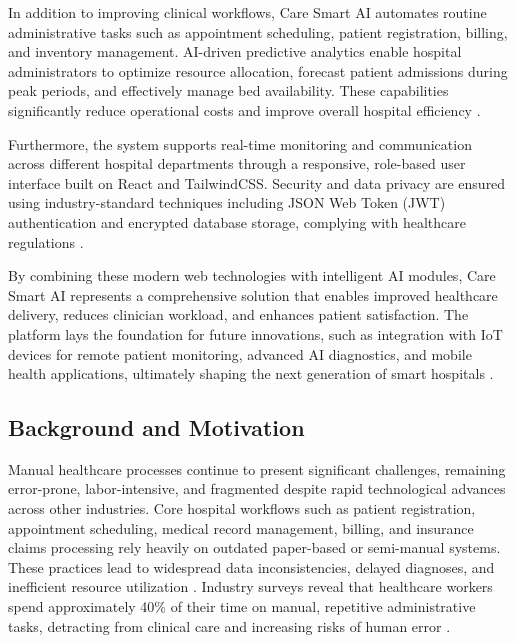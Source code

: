 \documentclass[conference]{IEEEtran}
\begin{document}
In addition to improving clinical workflows, Care Smart AI automates routine administrative tasks such as appointment scheduling, patient registration, billing, and inventory management. AI-driven predictive analytics enable hospital administrators to optimize resource allocation, forecast patient admissions during peak periods, and effectively manage bed availability. These capabilities significantly reduce operational costs and improve overall hospital efficiency \cite{web:13,web:16}.

Furthermore, the system supports real-time monitoring and communication across different hospital departments through a responsive, role-based user interface built on React and TailwindCSS. Security and data privacy are ensured using industry-standard techniques including JSON Web Token (JWT) authentication and encrypted database storage, complying with healthcare regulations \cite{web:17,web:18}.

By combining these modern web technologies with intelligent AI modules, Care Smart AI represents a comprehensive solution that enables improved healthcare delivery, reduces clinician workload, and enhances patient satisfaction. The platform lays the foundation for future innovations, such as integration with IoT devices for remote patient monitoring, advanced AI diagnostics, and mobile health applications, ultimately shaping the next generation of smart hospitals \cite{web:20}.





\subsection{Background and Motivation}

Manual healthcare processes continue to present significant challenges, remaining error-prone, labor-intensive, and fragmented despite rapid technological advances across other industries. Core hospital workflows such as patient registration, appointment scheduling, medical record management, billing, and insurance claims processing rely heavily on outdated paper-based or semi-manual systems. These practices lead to widespread data inconsistencies, delayed diagnoses, and inefficient resource utilization \cite{web:30,web:31}. Industry surveys reveal that healthcare workers spend approximately 40\% of their time on manual, repetitive administrative tasks, detracting from clinical care and increasing risks of human error \cite{web:30}.
\end{document}
